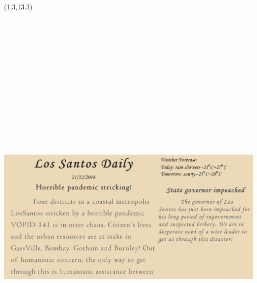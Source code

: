 \documentclass[hyperref={pdfpagelabels=false}]{beamer}
\begin{document}
\begin{frame}
	\begin{textblock}{10}(1.3,13.3)
		\begin{blankbox}
			\centering
			\includegraphics[angle=8,height=600pt]{img/news.png}
		\end{blankbox}
	\end{textblock}


\end{frame}
\end{document}
